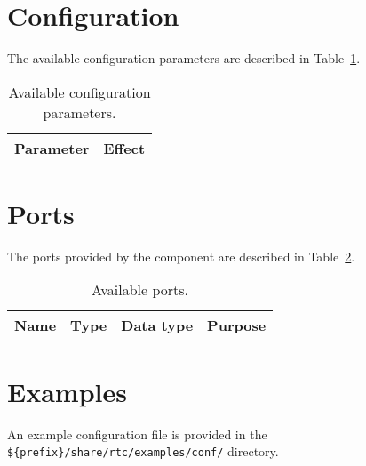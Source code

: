 \documentclass[a4paper,10pt]{article}
\newcommand{\ilcode}[1]{\lstinline|#1|}
\begin{document}
\section{Configuration}
\label{sec:configuration}

The available configuration parameters are described in
Table~\ref{tab:config_params}.

\begin{table}[t]
  \centering
  \begin{tabularx}{\columnwidth}{lX}
    \toprule
    Parameter & Effect \\
    \midrule
    \bottomrule
  \end{tabularx}
  \caption{Available configuration parameters.}
  \label{tab:config_params}
\end{table}

\section{Ports}
\label{sec:port}

The ports provided by the component are described in Table~\ref{tab:ports}.

\begin{table}[t]
  \centering
  \begin{tabularx}{\columnwidth}{lllX}
    \toprule
    Name & Type & Data type & Purpose \\
    \midrule
    \bottomrule
  \end{tabularx}
  \caption{Available ports.}
  \label{tab:ports}
\end{table}

\section{Examples}
\label{sec:examples}

An example configuration file is provided in the
\ilcode{${prefix}/share/rtc/examples/conf/} directory.

\end{document}

